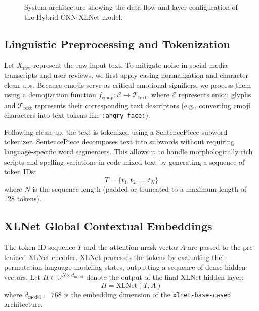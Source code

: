 \documentclass[conference]{IEEEtran}
\begin{document}
\begin{figure}[t]
\centering
{}
\caption{System architecture showing the data flow and layer configuration of the Hybrid CNN-XLNet model.}
\label{fig:architecture}
\end{figure}

\subsection{Linguistic Preprocessing and Tokenization}
Let $X_{\text{raw}}$ represent the raw input text. To mitigate noise in social media transcripts and user reviews, we first apply casing normalization and character clean-ups. Because emojis serve as critical emotional signifiers, we process them using a demojization function $f_{\text{emoji}}: \mathcal{E} \to \mathcal{T}_{\text{text}}$, where $\mathcal{E}$ represents emoji glyphs and $\mathcal{T}_{\text{text}}$ represents their corresponding text descriptors (e.g., converting emoji characters into text tokens like \texttt{:angry\_face:}).

Following clean-up, the text is tokenized using a SentencePiece subword tokenizer. SentencePiece decomposes text into subwords without requiring language-specific word segmenters. This allows it to handle morphologically rich scripts and spelling variations in code-mixed text by generating a sequence of token IDs:
\begin{equation}
    T = \{t_1, t_2, \dots, t_N\}
\end{equation}
where $N$ is the sequence length (padded or truncated to a maximum length of 128 tokens).

\subsection{XLNet Global Contextual Embeddings}
The token ID sequence $T$ and the attention mask vector $A$ are passed to the pre-trained XLNet encoder. XLNet processes the tokens by evaluating their permutation language modeling states, outputting a sequence of dense hidden vectors. Let $H \in \mathbb{R}^{N \times d_{\text{model}}}$ denote the output of the final XLNet hidden layer:
\begin{equation}
    H = \text{XLNet}(T, A)
\end{equation}
where $d_{\text{model}} = 768$ is the embedding dimension of the \texttt{xlnet-base-cased} architecture.
\end{document}
